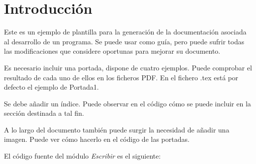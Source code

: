 

\section{Introducción}

Este es un ejemplo de plantilla para la generación de la documentación asociada al desarrollo de un programa. Se puede usar como guía, pero puede sufrir todas las modificaciones que considere oportunas para mejorar su documento.

Es necesario incluir una portada, dispone de cuatro ejemplos. Puede comprobar el resultado de cada uno de ellos en los ficheros PDF. En el fichero .tex está por defecto el ejemplo de Portada1.

Se debe añadir un índice. Puede observar en el código cómo se puede incluir en la sección destinada a tal fin.

A lo largo del documento también puede surgir la necesidad de añadir una imagen. Puede ver cómo hacerlo en el código de las portadas.

El código fuente del módulo \textit{Escribir} es el siguiente:






